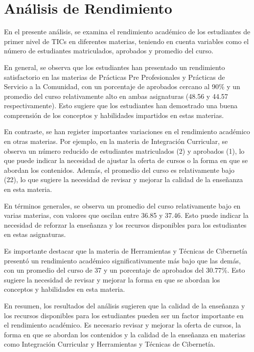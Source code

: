 \vspace{1cm}
\section{Análisis de Rendimiento}
En el presente análisis, se examina el rendimiento académico de los estudiantes de primer nivel de TICs en diferentes materias, teniendo en cuenta variables como el número de estudiantes matriculados, aprobados y promedio del curso.

En general, se observa que los estudiantes han presentado un rendimiento satisfactorio en las materias de Prácticas Pre Profesionales y Prácticas de Servicio a la Comunidad, con un porcentaje de aprobados cercano al 90\% y un promedio del curso relativamente alto en ambas asignaturas (48.56 y 44.57 respectivamente). Esto sugiere que los estudiantes han demostrado una buena comprensión de los conceptos y habilidades impartidos en estas materias.

En contraste, se han register importantes variaciones en el rendimiento académico en otras materias. Por ejemplo, en la materia de Integración Curricular, se observa un número reducido de estudiantes matriculados (2) y aprobados (1), lo que puede indicar la necesidad de ajustar la oferta de cursos o la forma en que se abordan los contenidos. Además, el promedio del curso es relativamente bajo (22), lo que sugiere la necesidad de revisar y mejorar la calidad de la enseñanza en esta materia.

En términos generales, se observa un promedio del curso relativamente bajo en varias materias, con valores que oscilan entre 36.85 y 37.46. Esto puede indicar la necesidad de reforzar la enseñanza y los recursos disponibles para los estudiantes en estas asignaturas.

Es importante destacar que la materia de Herramientas y Técnicas de Cibernetía presentó un rendimiento académico significativamente más bajo que las demás, con un promedio del curso de 37 y un porcentaje de aprobados del 30.77\%. Esto sugiere la necesidad de revisar y mejorar la forma en que se abordan los conceptos y habilidades en esta materia.

En resumen, los resultados del análisis sugieren que la calidad de la enseñanza y los recursos disponibles para los estudiantes pueden ser un factor importante en el rendimiento académico. Es necesario revisar y mejorar la oferta de cursos, la forma en que se abordan los contenidos y la calidad de la enseñanza en materias como Integración Curricular y Herramientas y Técnicas de Cibernetía.\\
\vspace{1cm}\\